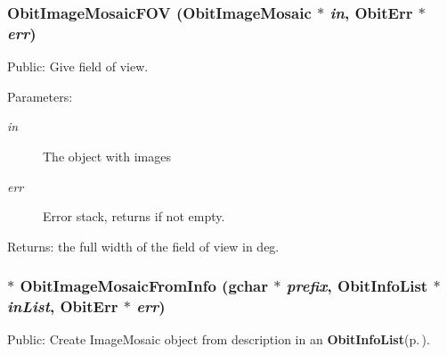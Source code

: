 \subsubsection{ Obit\-Image\-Mosaic\-FOV ({\bf Obit\-Image\-Mosaic} $\ast$ {\em in}, {\bf Obit\-Err} $\ast$ {\em err})}\label{ObitImageMosaic_8h_a20}


Public: Give field of view. 

\begin{Desc}
\item[Parameters:]
\begin{description}
\item[{\em in}]The object with images \item[{\em err}]Error stack, returns if not empty. \end{description}
\end{Desc}
\begin{Desc}
\item[Returns:]the full width of the field of view in deg. \end{Desc}
\subsubsection{$\ast$ Obit\-Image\-Mosaic\-From\-Info (gchar $\ast$ {\em prefix}, {\bf Obit\-Info\-List} $\ast$ {\em in\-List}, {\bf Obit\-Err} $\ast$ {\em err})}\label{ObitImageMosaic_8h_a7}


Public: Create Image\-Mosaic object from description in an {\bf Obit\-Info\-List}{\rm (p.\,\pageref{structObitInfoList})}. 

